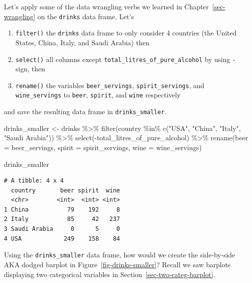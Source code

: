 \documentclass[
  letterpaper,
  DIV=11,
  numbers=noendperiod]{scrreprt}
\newenvironment{Shaded}{\begin{snugshade}}{\end{snugshade}}
\newcommand{\AttributeTok}[1]{\textcolor[rgb]{0.40,0.45,0.13}{#1}}
\newcommand{\FunctionTok}[1]{\textcolor[rgb]{0.28,0.35,0.67}{#1}}
\newcommand{\NormalTok}[1]{\textcolor[rgb]{0.00,0.23,0.31}{#1}}
\newcommand{\OtherTok}[1]{\textcolor[rgb]{0.00,0.23,0.31}{#1}}
\newcommand{\SpecialCharTok}[1]{\textcolor[rgb]{0.37,0.37,0.37}{#1}}
\newcommand{\StringTok}[1]{\textcolor[rgb]{0.13,0.47,0.30}{#1}}
\theoremstyle{definition}
\theoremstyle{remark}
\begin{document}
Let's apply some of the data wrangling verbs we learned in
Chapter~\ref{sec-wrangling} on the \texttt{drinks} data frame. Let's

\begin{enumerate}
\def\labelenumi{\arabic{enumi}.}
\item
  \texttt{filter()} the \texttt{drinks} data frame to only consider 4
  countries (the United States, China, Italy, and Saudi Arabia) then
\item
  \texttt{select()} all columns except
  \texttt{total\_litres\_of\_pure\_alcohol} by using \texttt{-} sign,
  then
\item
  \texttt{rename()} the variables \texttt{beer\_servings},
  \texttt{spirit\_servings}, and \texttt{wine\_servings} to
  \texttt{beer}, \texttt{spirit}, and \texttt{wine} respectively
\end{enumerate}

and save the resulting data frame in \texttt{drinks\_smaller}.

\begin{Shaded}
\begin{Highlighting}[]
\NormalTok{drinks\_smaller }\OtherTok{\textless{}{-}}\NormalTok{ drinks }\SpecialCharTok{\%\textgreater{}\%} 
  \FunctionTok{filter}\NormalTok{(country }\SpecialCharTok{\%in\%} \FunctionTok{c}\NormalTok{(}\StringTok{"USA"}\NormalTok{, }\StringTok{"China"}\NormalTok{, }\StringTok{"Italy"}\NormalTok{, }\StringTok{"Saudi Arabia"}\NormalTok{)) }\SpecialCharTok{\%\textgreater{}\%} 
  \FunctionTok{select}\NormalTok{(}\SpecialCharTok{{-}}\NormalTok{total\_litres\_of\_pure\_alcohol) }\SpecialCharTok{\%\textgreater{}\%} 
  \FunctionTok{rename}\NormalTok{(}\AttributeTok{beer =}\NormalTok{ beer\_servings, }\AttributeTok{spirit =}\NormalTok{ spirit\_servings, }\AttributeTok{wine =}\NormalTok{ wine\_servings)}

\NormalTok{drinks\_smaller}
\end{Highlighting}
\end{Shaded}

\begin{verbatim}
# A tibble: 4 x 4
  country       beer spirit  wine
  <chr>        <int>  <int> <int>
1 China           79    192     8
2 Italy           85     42   237
3 Saudi Arabia     0      5     0
4 USA            249    158    84
\end{verbatim}

Using the \texttt{drinks\_smaller} data frame, how would we create the
side-by-side AKA dodged barplot in Figure~\ref{fig-drinks-smaller}?
Recall we saw barplots displaying two categorical variables in
Section~\ref{sec-two-categ-barplot}.
\end{document}
